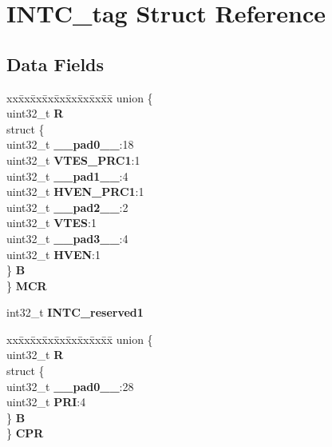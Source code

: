 \hypertarget{structINTC__tag}{}\section{I\+N\+T\+C\+\_\+tag Struct Reference}
\label{structINTC__tag}
\subsection*{Data Fields}
\begin{DoxyCompactItemize}
\item 
\mbox{\label{structINTC__tag_a9ad85cef2263527fd6400fa7f545cef9}} 
\begin{tabbing}
xx\=xx\=xx\=xx\=xx\=xx\=xx\=xx\=xx\=\kill
union \{\\
\>uint32\_t {\bfseries R}\\
\>struct \{\\
\>\>uint32\_t {\bfseries \_\_pad0\_\_}:18\\
\>\>uint32\_t {\bfseries VTES\_PRC1}:1\\
\>\>uint32\_t {\bfseries \_\_pad1\_\_}:4\\
\>\>uint32\_t {\bfseries HVEN\_PRC1}:1\\
\>\>uint32\_t {\bfseries \_\_pad2\_\_}:2\\
\>\>uint32\_t {\bfseries VTES}:1\\
\>\>uint32\_t {\bfseries \_\_pad3\_\_}:4\\
\>\>uint32\_t {\bfseries HVEN}:1\\
\>\} {\bfseries B}\\
\} {\bfseries MCR}\\

\end{tabbing}\item 
\mbox{\label{structINTC__tag_ad2f0a6ad512410da4947a6a4cbe03b5e}} 
int32\+\_\+t {\bfseries I\+N\+T\+C\+\_\+reserved1}
\item 
\mbox{\label{structINTC__tag_ad56c93c1746978b400a790f28008246e}} 
\begin{tabbing}
xx\=xx\=xx\=xx\=xx\=xx\=xx\=xx\=xx\=\kill
union \{\\
\>uint32\_t {\bfseries R}\\
\>struct \{\\
\>\>uint32\_t {\bfseries \_\_pad0\_\_}:28\\
\>\>uint32\_t {\bfseries PRI}:4\\
\>\} {\bfseries B}\\
\} {\bfseries CPR}\\


\end{tabbing}
\end{DoxyCompactItemize}
